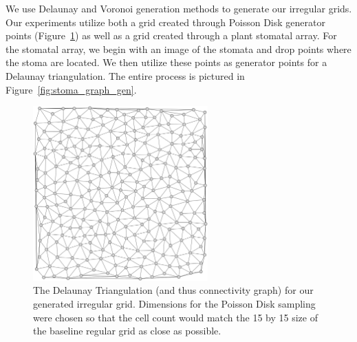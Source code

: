 \documentclass[a4paper,11pt,twoside]{report}
\begin{document}
We use Delaunay and Voronoi generation methods to generate our irregular grids. Our experiments utilize both a grid created through Poisson Disk generator points (Figure~\ref{fig:lm_delaunay}) as well as a grid created through a plant stomatal array. For the stomatal array, we begin with an image of the stomata and drop points where the stoma are located. We then utilize these points as generator points for a Delaunay triangulation. The entire process is pictured in Figure~\ref{fig:stoma_graph_gen}.

\begin{figure}[htp]
\centering
\includegraphics[width=0.6\textwidth]{ch5_figs/lm_delaunay}
\caption[Irregular Delaunay Grid for Majority Task]{
  The Delaunay Triangulation (and thus connectivity graph) for our generated irregular grid. Dimensions for the Poisson Disk sampling were chosen so that the cell count would match the 15 by 15 size of the baseline regular grid as close as possible.
}
\label{fig:lm_delaunay}
\end{figure}
\end{document}

